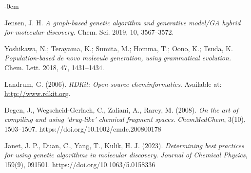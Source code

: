 \documentclass[life,article,submit,pdftex,moreauthors]{Definitions/mdpi}
\begin{document}
\begin{adjustwidth}{-\extralength}{0cm}
{\begin{thebibliography}{999}
Jensen, J. H.
\textit{A graph-based genetic algorithm and generative model/GA hybrid for molecular discovery.}
Chem. Sci. 2019, 10, 3567--3572.

Yoshikawa, N.; Terayama, K.; Sumita, M.; Homma, T.; Oono, K.; Tsuda, K.
\textit{Population-based de novo molecule generation, using grammatical evolution.}
Chem. Lett. 2018, 47, 1431--1434.

Landrum, G. (2006). \textit{RDKit: Open-source cheminformatics}. Available at: \url{http://www.rdkit.org}.

Degen, J., Wegscheid-Gerlach, C., Zaliani, A., Rarey, M. (2008).
\textit{On the art of compiling and using ‘drug-like’ chemical fragment spaces}.
\textit{ChemMedChem}, 3(10), 1503–1507. https://doi.org/10.1002/cmdc.200800178

Janet, J. P., Duan, C., Yang, T., Kulik, H. J. (2023).
\textit{Determining best practices for using genetic algorithms in molecular discovery}.
\textit{Journal of Chemical Physics}, 159(9), 091501. https://doi.org/10.1063/5.0158336


\end{thebibliography}
}



%


\PublishersNote{}
\end{adjustwidth}
\end{document}
